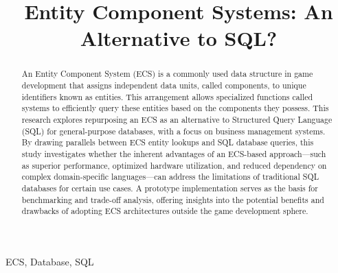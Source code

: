 \documentclass[conference]{IEEEtran}
\begin{document}
\title{Entity Component Systems: An Alternative to SQL?\\
}

\author{
}

\maketitle

\begin{abstract}
An Entity Component System (ECS) is a commonly used data structure in game development that assigns independent data units, called components, to unique identifiers known as entities. This arrangement allows specialized functions called systems to efficiently query these entities based on the components they possess. This research explores repurposing an ECS as an alternative to Structured Query Language (SQL) for general-purpose databases, with a focus on business management systems. By drawing parallels between ECS entity lookups and SQL database queries, this study investigates whether the inherent advantages of an ECS-based approach—such as superior performance, optimized hardware utilization, and reduced dependency on complex domain-specific languages—can address the limitations of traditional SQL databases for certain use cases. A prototype implementation serves as the basis for benchmarking and trade-off analysis, offering insights into the potential benefits and drawbacks of adopting ECS architectures outside the game development sphere.
\end{abstract}

\begin{IEEEkeywords}
ECS, Database, SQL
\end{IEEEkeywords}
\end{document}
